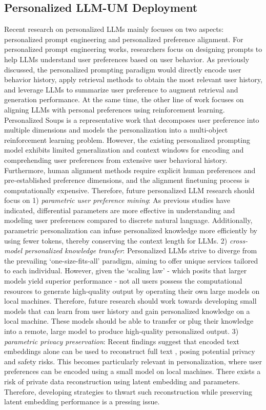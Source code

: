 \documentclass[11pt]{article}
\begin{document}
\subsection{Personalized LLM-UM Deployment}
Recent research on personalized LLMs mainly focuses on two aspects: personalized prompt engineering and personalized preference alignment. For personalized prompt engineering works, researchers focus on designing prompts to help LLMs understand user preferences based on user behavior. As previously discussed, the personalized prompting paradigm would directly encode user behavior history, apply retrieval methods to obtain the most relevant user history, and leverage LLMs to summarize user preference to augment retrieval and generation performance. At the same time, the other line of work focuses on aligning LLMs with personal preferences using reinforcement learning. Personalized Soups \cite{jang2023personalized} is a representative work that decomposes user preference into multiple dimensions and models the personalization into a multi-object reinforcement learning problem. However, the existing personalized prompting model exhibits limited generalization and context windows for encoding and comprehending user preferences from extensive user behavioral history. Furthermore, human alignment methods require explicit human preferences and pre-established preference dimensions, and the alignment finetuning process is computationally expensive. Therefore, future personalized LLM research should focus on 1) \textit{parametric user preference mining}: As previous studies \cite{liu2023gpt} have indicated, differential parameters are more effective in understanding and modeling user preferences compared to discrete natural language. Additionally, parametric personalization can infuse personalized knowledge more efficiently by using fewer tokens, thereby conserving the context length for LLMs.
2) \textit{cross-model personalized knowledge transfer}: Personalized LLMs strive to diverge from the prevailing `one-size-fits-all' paradigm, aiming to offer unique services tailored to each individual. However, given the `scaling law' - which posits that larger models yield superior performance - not all users possess the computational resources to generate high-quality output by operating their own large models on local machines. Therefore, future research should work towards developing small models that can learn from user history and gain personalized knowledge on a local machine. These models should be able to transfer or plug their knowledge into a remote, large model to produce high-quality personalized output.
3) \textit{parametric privacy preservation}: Recent findings suggest that encoded text embeddings alone can be used to reconstruct full text \cite{morris2023text}, posing potential privacy and safety risks. This becomes particularly relevant in personalization, where user preferences can be encoded using a small model on local machines. There exists a risk of private data reconstruction using latent embedding and parameters. Therefore, developing strategies to thwart such reconstruction while preserving latent embedding performance is a pressing issue.
\end{document}
